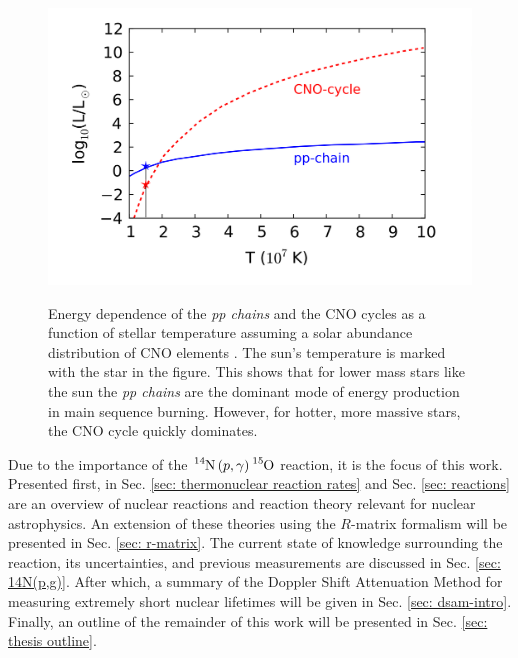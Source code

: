 \begin{figure}
\includegraphics[width=\linewidth]{figures/energyProduction.png}
\label{fig: CNO-energy}
\caption{Energy dependence of the \textit{pp chains} and the CNO cycles as a function of stellar temperature assuming a solar abundance distribution of CNO elements \cite{Bertulani2016}. The sun's temperature is marked with the star in the figure. This shows that for lower mass stars like the sun the \textit{pp chains} are the dominant mode of energy production in main sequence burning. However, for hotter, more massive stars, the CNO cycle quickly dominates. }
\end{figure}



Due to the importance of the $\ce{^{14}N} \left( p, \gamma \right) \ce{^{15}O}$ reaction, it is the focus of this work. Presented first, in Sec. \ref{sec: thermonuclear reaction rates} and Sec. \ref{sec: reactions} are an overview of nuclear reactions and reaction theory relevant for nuclear astrophysics. An extension of these theories using the $R$-matrix formalism will be presented in Sec. \ref{sec: r-matrix}. The current state of knowledge surrounding the reaction, its uncertainties, and previous measurements are discussed in Sec. \ref{sec: 14N(p,g)}. After which, a summary of the Doppler Shift Attenuation Method for measuring extremely short nuclear lifetimes will be given in Sec. \ref{sec: dsam-intro}. Finally, an outline of the remainder of this work will be presented in Sec. \ref{sec: thesis outline}.


